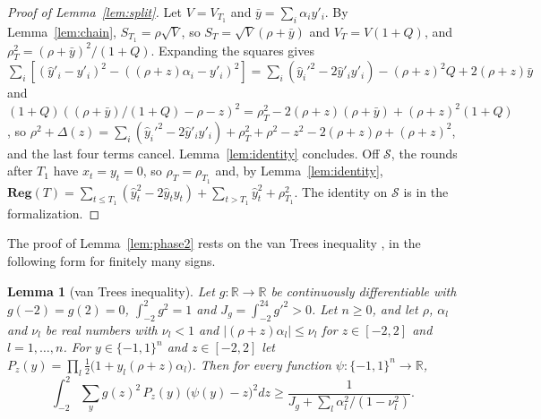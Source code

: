\documentclass[12pt]{amsart}
\newtheorem{lemma}[theorem]{Lemma}
\theoremstyle{definition}
\numberwithin{equation}{section}
\newcommand{\R}{\mathbb{R}}
\newcommand{\Reg}{\mathbf{Reg}}
\newcommand{\yh}{\hat y}
\newcommand{\Succ}{\mathcal{S}}
\newcommand{\leanmap}[1]{\ignorespaces}
\newcommand{\mapnote}[1]{\ignorespaces}
\begin{document}
\begin{proof}[Proof of Lemma~\ref{lem:split}]
Let $V=V_{T_1}$ and $\bar y=\sum_i\alpha_iy'_i$. By Lemma~\ref{lem:chain}, $S_{T_1}=\rho\sqrt V$, so $S_T=\sqrt V(\rho+\bar y)$ and $V_T=V(1+Q)$, and $\rho_T^2=(\rho+\bar y)^2/(1+Q)$. Expanding the squares gives $\sum_i[(\yh'_i-y'_i)^2-((\rho+z)\alpha_i-y'_i)^2]=\sum_i(\yh_i'^2-2\yh'_iy'_i)-(\rho+z)^2Q+2(\rho+z)\bar y$ and $(1+Q)((\rho+\bar y)/(1+Q)-\rho-z)^2=\rho_T^2-2(\rho+z)(\rho+\bar y)+(\rho+z)^2(1+Q)$, so $\rho^2+\Delta(z)=\sum_i(\yh_i'^2-2\yh'_iy'_i)+\rho_T^2+\rho^2-z^2-2(\rho+z)\rho+(\rho+z)^2$, and the last four terms cancel. Lemma~\ref{lem:identity} concludes. Off $\Succ$, the rounds after $T_1$ have $x_t=y_t=0$, so $\rho_T=\rho_{T_1}$ and, by Lemma~\ref{lem:identity}, $\Reg(T)=\sum_{t\le T_1}(\yh_t^2-2\yh_ty_t)+\sum_{t>T_1}\yh_t^2+\rho_{T_1}^2$. The identity on $\Succ$ is  in the formalization.
\end{proof}

The proof of Lemma~\ref{lem:phase2} rests on the van Trees inequality \citep[Section~2, inequality~(3)]{GL}, in the following form for finitely many signs.

\begin{lemma}[van Trees inequality]\label{lem:vT}
\leanmap{RegretKappa.LowerSharp.vanTreesG}
\mapnote{Lean proves it for the probabilities $\frac12(1+y_l(a_l+b_lz))$ with $|a_l+b_lz|\le c_l<1$ and the bound $1/(J_g+\sum_lb_l^2/(1-c_l^2))$, of which the lemma is the case $a_l=\rho\alpha_l$, $b_l=\alpha_l$, $c_l=\nu_l$.}
Let $g\colon\R\to\R$ be continuously differentiable with $g(-2)=g(2)=0$, $\int_{-2}^2g^2=1$ and $J_g=\int_{-2}^24g'^2>0$. Let $n\ge0$, and let $\rho$, $\alpha_l$ and $\nu_l$ be real numbers with $\nu_l<1$ and $|(\rho+z)\alpha_l|\le\nu_l$ for $z\in[-2,2]$ and $l=1,\dots,n$. For $y\in\{-1,1\}^n$ and $z\in[-2,2]$ let $P_z(y)=\prod_l\frac12\bigl(1+y_l(\rho+z)\alpha_l\bigr)$. Then for every function $\psi\colon\{-1,1\}^n\to\R$,
\[
\int_{-2}^2\sum_{y}g(z)^2\,P_z(y)\,\bigl(\psi(y)-z\bigr)^2dz\ge\frac1{J_g+\sum_l\alpha_l^2/(1-\nu_l^2)}.
\]
\end{lemma}
\end{document}
